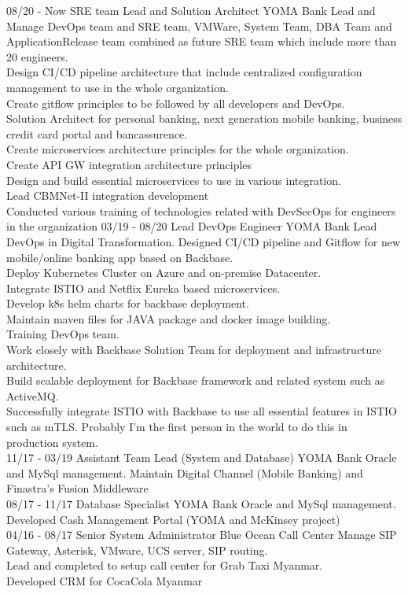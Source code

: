 \documentclass[]{friggeri-cv}
\begin{document}
\begin{entrylist}
  \entry
    {08/20 - Now}
    {SRE team Lead and Solution Architect}
    {YOMA Bank}
    {Lead and Manage DevOps team and SRE team, VMWare, System Team, DBA Team and ApplicationRelease team combined as future SRE team which include more than 20 engineers.\\Design CI/CD pipeline architecture that include centralized configuration management to use in the whole organization.\\Create gitflow principles to be followed by all developers and DevOps.\\Solution Architect for personal banking, next generation mobile banking, business credit card portal and bancassurence.\\Create microservices architecture principles for the whole organization.\\Create API GW integration architecture principles\\Design and build essential microservices to use in various integration.\\Lead CBMNet-II integration development\\Conducted various training of technologies related with DevSecOps for engineers in the organization}
  \entry
    {03/19 - 08/20}
    {Lead DevOps Engineer}
    {YOMA Bank}
    {Lead DevOps in Digital Transformation. Designed CI/CD pipeline and Gitflow for new mobile/online banking app based on Backbase.\\Deploy Kubernetes Cluster on Azure and on-premise Datacenter.\\Integrate ISTIO and Netflix Eureka based microservices.\\Develop k8s helm charts for backbase deployment.\\Maintain maven files for JAVA package and docker image building.\\Training DevOps team.\\Work closely with Backbase Solution Team for deployment and infrastructure architecture.\\Build scalable deployment for Backbase framework and related system such as ActiveMQ.\\Successfully integrate ISTIO with Backbase to use all essential features in ISTIO such as mTLS. Probably I'm the first person in the world to do this in production system.\\}
  \entry
    {11/17 - 03/19}
    {Assistant Team Lead (System and Database)}
    {YOMA Bank}
    {Oracle and MySql management. Maintain Digital Channel (Mobile Banking) and Finastra's Fusion Middleware\\
    }
  \entry
    {08/17 - 11/17}
    {Database Specialist}
    {YOMA Bank}
    {Oracle and MySql management. Developed Cash Management Portal (YOMA and McKinsey project)\\}
  \entry
    {04/16 - 08/17}
    {Senior System Administrator}
    {Blue Ocean Call Center}
    {Manage SIP Gateway, Asterisk, VMware, UCS server, SIP routing.\\ Lead and completed to setup call center for Grab Taxi Myanmar.\\ Developed CRM for CocaCola Myanmar\\ }
    ~
\end{entrylist}
\end{document}
